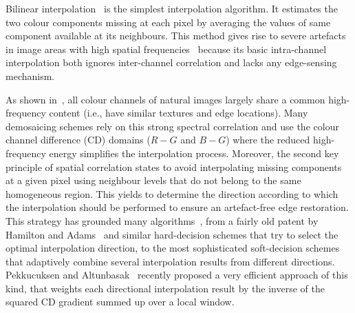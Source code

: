 \documentclass[twoside]{article}
\begin{document}
Bilinear interpolation~\cite{sakamoto_ieeetce_1998} is the simplest interpolation algorithm. It estimates the two colour components missing at each pixel by averaging the values of same component available at its neighbours. This method gives rise to severe artefacts in image areas with high spatial frequencies~\cite{chang_jei_2006} because its basic intra-channel interpolation both ignores inter-channel correlation and lacks any edge-sensing mechanism.

As shown in~\cite{gunturk_ip_2002}, all colour channels of natural images largely share a common high-frequency content (i.e., have similar textures and edge locations). Many demosaicing schemes rely on this strong spectral correlation and use the colour channel difference (CD) domains ($R-G$ and $B-G$) where the reduced high-frequency energy simplifies the interpolation process. Moreover, the second key principle of spatial correlation states to avoid interpolating missing components at a given pixel using neighbour levels that do not belong to the same homogeneous region. This yields to determine the direction according to which the interpolation should be performed to ensure an artefact-free edge restoration. This strategy has grounded many algorithms~\cite{menon_ic_2011}, from a fairly old patent by Hamilton and Adams~\cite{hamilton_patent_1997} and similar hard-decision schemes that try to select the optimal interpolation direction, to the most sophisticated soft-decision schemes that adaptively combine several interpolation results from different directions. Pekkucuksen and Altunbasak~\cite{pekkucuksen_ip_2013} recently proposed a very efficient approach of this kind, that weights each directional interpolation result by the inverse of the squared CD gradient summed up over a local window.
\end{document}
